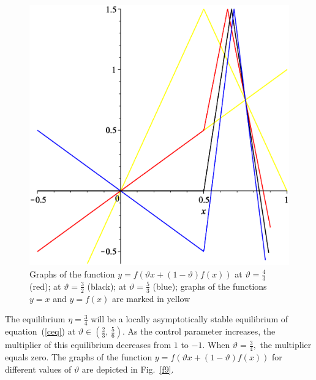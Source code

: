 \documentclass[12pt,a4paper]{amsart}
\begin{document}
\begin{figure}[h!]
\centering
\includegraphics[scale=0.28]{Fig8}
\caption{Graphs of the function $y = f \left( \vartheta x + (1 - \vartheta)f(x) \right)$ at $\vartheta=\frac43$ (red);
at $\vartheta=\frac32$ (black); at $\vartheta=\frac53$ (blue); graphs of the functions $y=x$ and $y=f(x)$ 
are marked in yellow} \label{f8}
\end{figure}

The equilibrium $\eta=\frac34$ will be a locally asymptotically stable equilibrium of equation~(\ref{ceq}) at 
$\vartheta \in \left(\frac23,\,\frac56\right).$ As the control parameter increases, the multiplier of this equilibrium 
decreases from $1$ to $-1.$ When $\vartheta=\frac34,$ the multiplier equals zero. The graphs of the function 
$y = f \left( \vartheta x + (1 - \vartheta)f(x) \right)$ for different values of $\vartheta$ are depicted in Fig.~\ref{f9}. 
\end{document}
